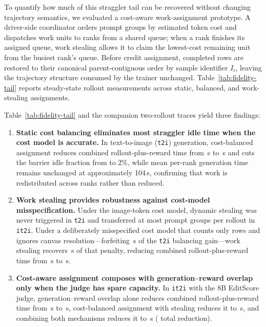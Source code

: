 To quantify how much of this straggler tail can be recovered without changing trajectory semantics, we evaluated a cost-aware work-assignment prototype.
A driver-side coordinator orders prompt groups by estimated token cost and dispatches work units to ranks from a shared queue; when a rank finishes its assigned queue, work stealing allows it to claim the lowest-cost remaining unit from the busiest rank's queue.
Before credit assignment, completed rows are restored to their canonical parent-contiguous order by sample identifier $I_i$, leaving the trajectory structure consumed by the trainer unchanged.
Table~\ref{tab:fidelity-tail} reports steady-state rollout measurements across static, balanced, and work-stealing assignments.

\begin{table}[H]
\caption{Comparison of rank-assignment strategies on mixed-canvas batches (second rollout of each arm on one eight-GPU H20 node) for text-to-image (\texttt{t2i}) and image-to-image editing (\texttt{it2i}). ``Idle'' denotes the fraction of the rollout window during which at least one rank has finished generation and waits at the barrier. Except in the row-count ablation discussed in the text, the cost model estimates work by output image tokens.}
\label{tab:fidelity-tail}
\centering
\small

\end{table}

Table~\ref{tab:fidelity-tail} and the companion two-rollout traces yield three findings:
\begin{enumerate}
  \item \textbf{Static cost balancing eliminates most straggler idle time when the cost model is accurate.} In text-to-image (\texttt{t2i}) generation, cost-balanced assignment reduces combined rollout-plus-reward time from \RFTtoiBase{}\,s to \RFTtoiBalanced{}\,s and cuts the barrier idle fraction from \RFTtoiIdle{} to 2\%, while mean per-rank generation time remains unchanged at approximately 104\,s, confirming that work is redistributed across ranks rather than reduced.
  \item \textbf{Work stealing provides robustness against cost-model misspecification.} Under the image-token cost model, dynamic stealing was never triggered in \texttt{t2i} and transferred at most \RFStealPixelsEditMax{} prompt groups per rollout in \texttt{it2i}. Under a deliberately misspecified cost model that counts only rows and ignores canvas resolution---forfeiting \RFNaiveGap{}\,s of the \texttt{t2i} balancing gain---work stealing recovers \RFStealRecovered{}\,s of that penalty, reducing combined rollout-plus-reward time from \RFNaiveBalanced{}\,s to \RFNaiveSteal{}\,s.
  \item \textbf{Cost-aware assignment composes with generation--reward overlap only when the judge has spare capacity.} In \texttt{it2i} with the 8B EditScore judge, generation--reward overlap alone reduces combined rollout-plus-reward time from \RFSmallBase{}\,s to \RFSmallOverlap{}\,s, cost-balanced assignment with stealing reduces it to \RFSmallSteal{}\,s, and combining both mechanisms reduces it to \RFSmallBoth{}\,s (\RFSmallBothSaving{} total reduction).
\end{enumerate}

